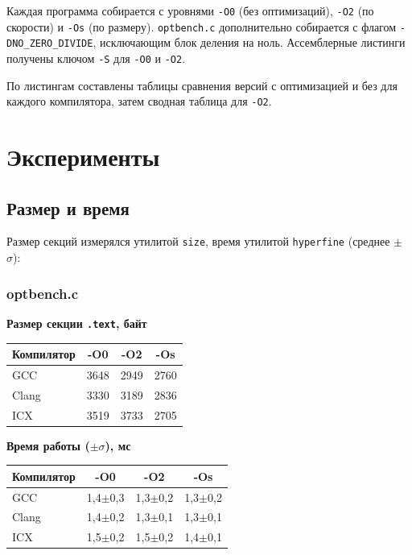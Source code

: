 \documentclass[a4paper]{article}
\begin{document}
Каждая программа собирается с уровнями \texttt{-O0} (без оптимизаций), \texttt{-O2} (по скорости) и \texttt{-Os} (по размеру). \texttt{optbench.c} дополнительно собирается с флагом \texttt{-DNO\_ZERO\_DIVIDE}, исключающим блок деления на ноль. Ассемблерные листинги получены ключом \texttt{-S} для \texttt{-O0} и \texttt{-O2}.

По листингам составлены таблицы сравнения версий с оптимизацией и без для каждого компилятора, затем сводная таблица для \texttt{-O2}.

\section{Эксперименты}

\subsection{Размер и время}

Размер секций измерялся утилитой \texttt{size}, время утилитой \texttt{hyperfine} (среднее \(\pm\) \(\sigma\)):

\subsubsection*{optbench.c}
\begin{table}[H]
\centering
\footnotesize 
\setlength{\tabcolsep}{2pt}
\begin{minipage}{0.48\textwidth}
    \centering
    \textbf{Размер секции \texttt{.text}, байт}\par\vspace{2pt}
    \begin{tabular}{|l|c|c|c|}
    \hline
    Компилятор & -O0 & -O2 & -Os \\
    \hline
    GCC & 3648 & 2949 & 2760 \\
    Clang & 3330 & 3189 & 2836 \\
    ICX & 3519 & 3733 & 2705 \\
    \hline
    \end{tabular}
\end{minipage}\hfill
\begin{minipage}{0.48\textwidth}
    \centering
    \textbf{Время работы (\(\pm \sigma\)), мс}\par\vspace{2pt}
    \begin{tabular}{|l|c|c|c|}
    \hline
    Компилятор & -O0 & -O2 & -Os \\
    \hline
    GCC & 1,4\(\pm\)0,3 & 1,3\(\pm\)0,2 & 1,3\(\pm\)0,2 \\
    Clang & 1,4\(\pm\)0,2 & 1,3\(\pm\)0,1 & 1,3\(\pm\)0,1 \\
    ICX & 1,5\(\pm\)0,2 & 1,5\(\pm\)0,2 & 1,4\(\pm\)0,1 \\
    \hline
    \end{tabular}
\end{minipage}
\end{table}
\end{document}

